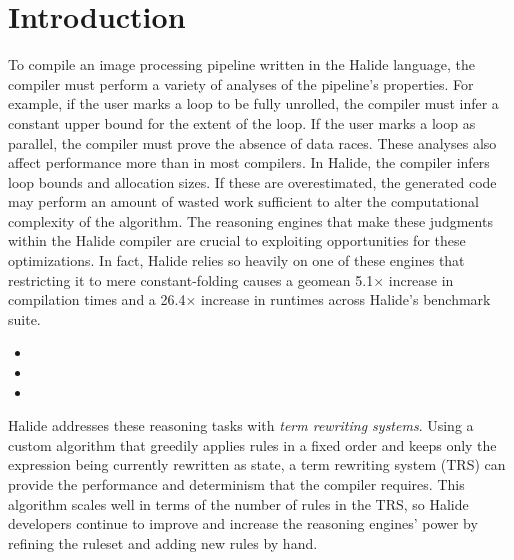 \chapter{Introduction}
\label{sec:intro}

To compile an image processing pipeline written in the
  Halide language, the compiler must perform a variety of analyses of
  the pipeline's properties. For example, if the user marks a
  loop to be fully unrolled, the compiler must infer a constant upper
  bound for the extent of the loop. If the user marks
  a loop as parallel, the compiler must prove the absence of data
  races. These analyses also affect performance more than in most
  compilers. In Halide, the compiler infers loop bounds and allocation sizes.
  If these are overestimated, the generated code may
  perform an amount of wasted work sufficient to alter the
  computational complexity of the algorithm. The reasoning engines that make these judgments within the Halide compiler are crucial to exploiting opportunities for these optimizations.
  In fact, Halide relies so heavily on one of these engines that restricting it
  to mere constant-folding causes a geomean 5.1$\times$ increase in
  compilation times and a 26.4$\times$ increase in runtimes across
  Halide's benchmark suite.


\begin{itemize}
  \item {}
  \item {}
  \item {}
\end{itemize}

Halide addresses these reasoning tasks with \emph{term rewriting systems}. Using a custom algorithm 
that greedily applies rules in a fixed order and keeps only the expression being currently 
rewritten as state, a term rewriting system (TRS) can provide the performance and determinism 
that the compiler requires. This algorithm scales well in terms of the number of rules
in the TRS, so Halide developers continue to improve and increase the reasoning engines'
power by refining the ruleset and adding new rules by hand.

